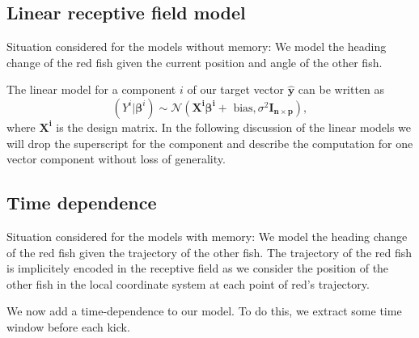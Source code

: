 \documentclass[nobib, a4paper]{tufte-handout}
\begin{document}
\subsection{Linear receptive field model}
\begin{marginfigure}
 \caption{Situation considered for the models without memory:
 We model the heading change of the red fish given the current position and angle of the other fish.}
\end{marginfigure}

The linear model for a component \(i\) of our target vector \(\hat{\bm{y}}\) can be written as
\begin{equation*}
 \left( Y^i | \bm{\beta}^{i} \right)  \sim \mathcal{N} \left( \bm{X^i} \bm{\beta^i} + \text{ bias}, \sigma^2 \bm{I_{n \times p}}  \right),
\end{equation*}
where \(\bm{X^i}\) is the design matrix. 
In the following discussion of the linear models we will drop the superscript for the component and describe the computation for one vector component without loss of generality.

\subsection{Time dependence}
\begin{marginfigure}
 \caption{Situation considered for the models with memory:
   We model the heading change of the red fish given the trajectory of the other fish.
 The trajectory of the red fish is implicitely encoded in the receptive field as we consider the position of the other fish in the local coordinate system at each point of red's trajectory.}
\end{marginfigure}
We now add a time-dependence to our model.
To do this, we extract some time window before each kick.
\end{document}
